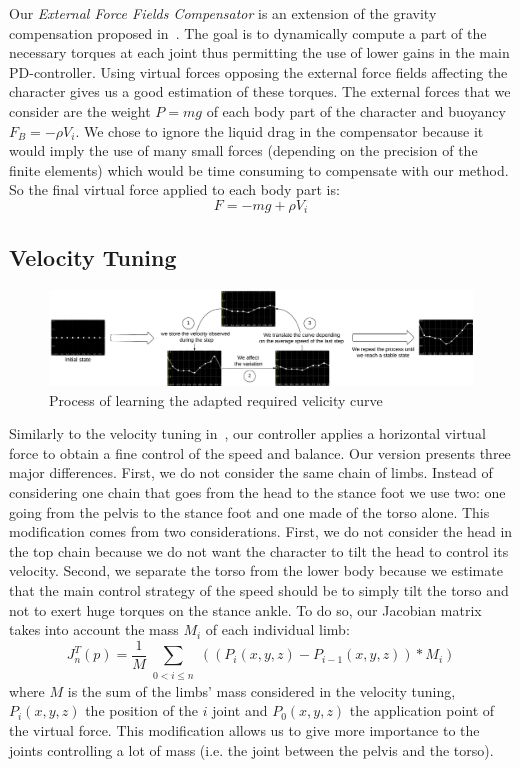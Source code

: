 \documentclass[conference]{acmsiggraph}
\begin{document}
Our \textit{External Force Fields Compensator} is an extension of the gravity compensation proposed in~\cite{coros2010generalized}. The goal is to dynamically compute a part of the necessary torques at each joint thus permitting the use of lower gains in the main PD-controller. Using virtual forces opposing the external force fields affecting the character gives us a good estimation of these torques. The external forces that we consider are the weight $P=mg$ of each body part of the character and buoyancy $F_B=-\rho V_i$. We chose to ignore the liquid drag in the compensator because it would imply the use of many small forces (depending on the precision of the finite elements) which would be time consuming to compensate with our method. So the final virtual force applied to each body part is:
$$
F=-mg+\rho V_i
$$

\subsection{Velocity Tuning}
\label{sec:speed_virt_force}

\begin{figure}[t]
\centering
\includegraphics[scale=0.35]{images/speed_curve_learner.pdf}
\caption{Process of learning the adapted required velicity curve}
\label{fig:speed_curve_learner}
\end{figure}

Similarly to the velocity tuning in~\cite{coros2010generalized}, our controller applies a horizontal virtual force to obtain a fine control of the speed and balance. Our version presents three major differences. First, we do not consider the same chain of limbs. Instead of considering one chain that goes from the head to the stance foot we use two: one going from the pelvis to the stance foot and one made of the torso alone. This modification comes from two considerations. First, we do not consider the head in the top chain because we do not want the character to tilt the head to control its velocity. Second, we separate the torso from the lower body because we estimate that the main control strategy of the speed should be to simply tilt the torso and not to exert huge torques on the stance ankle. To do so, our Jacobian matrix takes into account the mass $M_i$ of each individual limb:
$$
J_n ^T (p)=\frac{1}{M}\sum_{\substack{0<i\leq n}} ((P_i(x,y,z)-P_{i-1}(x,y,z))*M_i)
$$
where $M$ is the sum of the limbs' mass considered in the velocity tuning, $P_i(x,y,z)$ the position of the $i$ joint and $P_0(x,y,z)$ the application point of the virtual force. This modification allows us to give more importance to the joints controlling a lot of mass (i.e. the joint between the pelvis and the torso).
\end{document}
